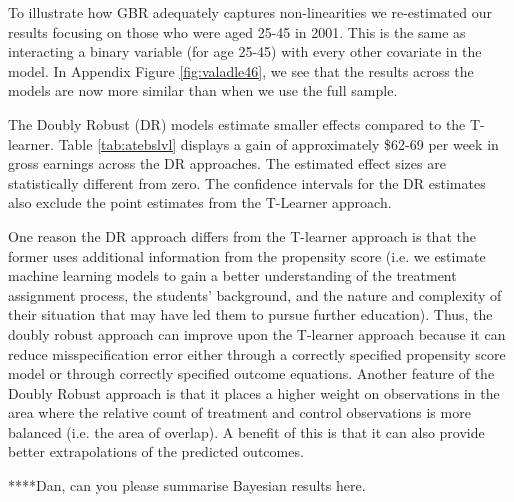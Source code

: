 \documentclass[12pt, a4paper]{article}
\begin{document}
To illustrate how GBR adequately captures non-linearities we re-estimated our results focusing on those who were aged 25-45 in 2001. This is the same as interacting a binary variable (for age 25-45) with every other covariate in the model. In Appendix Figure \ref{fig:valadle46}, we see that the results across the models are now more similar than when we use the full sample.

The Doubly Robust (DR) models estimate smaller effects compared to the T-learner. Table \ref{tab:atebslvl} displays a gain of approximately \$62-69 per week in gross earnings across the DR approaches. The estimated effect sizes are statistically different from zero. The confidence intervals for the DR estimates also exclude the point estimates from the T-Learner approach.

One reason the DR approach differs from the T-learner approach is that the former uses additional information from the propensity score (i.e. we estimate machine learning models to gain a better understanding of the treatment assignment process, the students’ background, and the nature and complexity of their situation that may have led them to pursue further education). Thus, the doubly robust approach can improve upon the T-learner approach because it can reduce misspecification error either through a correctly specified propensity score model or through correctly specified outcome equations. Another feature of the Doubly Robust approach is that it places a higher weight on observations in the area where the relative count of treatment and control observations is more balanced (i.e. the area of overlap). A benefit of this is that it can also provide better extrapolations of the predicted outcomes. 

****Dan, can you please summarise Bayesian results here.

%
%
\end{document}
